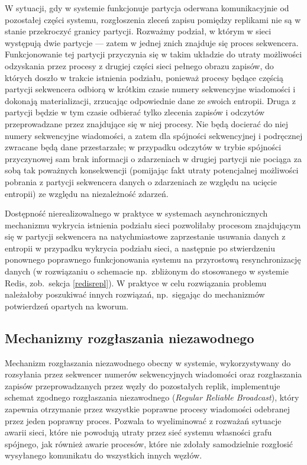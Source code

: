 W sytuacji, gdy w systemie funkcjonuje partycja oderwana komunikacyjnie od pozostałej części systemu, rozgłoszenia zleceń zapisu pomiędzy replikami nie są w stanie przekroczyć granicy partycji. Rozważmy podział, w którym w sieci występują dwie partycje --- zatem w jednej znich znajduje się proces sekwencera. Funkcjonowanie tej partycji przyczynia się w takim układzie do utraty możliwości odzyskania przez procesy z drugiej części sieci pełnego obrazu zapisów, do których doszło w trakcie istnienia podziału, ponieważ procesy będące częścią partycji sekwencera odbiorą w krótkim czasie numery sekwencyjne wiadomości i dokonają materializacji, zrzucając odpowiednie dane ze swoich entropii. Druga z partycji będzie w tym czasie odbierać tylko zlecenia zapisów i odczytów przeprowadzane przez znajdujące się w niej procesy. Nie będą docierać do niej numery sekwencyjne wiadomości, a zatem dla spójności sekwencyjnej i podręcznej zwracane będą dane przestarzałe; w przypadku odczytów w trybie spójności przyczynowej sam brak informacji o zdarzeniach w drugiej partycji nie pociąga za sobą tak poważnych konsekwencji (pomijając fakt utraty potencjalnej możliwości pobrania z partycji sekwencera danych o zdarzeniach ze względu na ucięcie entropii) ze względu na niezależność zdarzeń.

Dostępność nierealizowalnego w praktyce w systemach asynchronicznych mechanizmu wykrycia istnienia
podziału sieci pozwoliłaby procesom znajdującym się w partycji sekwencera na natychmiastowe
zaprzestanie usuwania danych z entropii w przypadku wykrycia podziału sieci, a następnie po
stwierdzeniu ponownego poprawnego funkcjonowania systemu na przyrostową resynchronizację danych (w
rozwiązaniu o schemacie np.\ zbliżonym do stosowanego w systemie Redis, zob.\ sekcja
\ref{redisrepl}). W praktyce w celu rozwiązania problemu należałoby poszukiwać innych rozwiązań,
np.\ sięgając do mechanizmów potwierdzeń opartych na kworum.

\subsection{Mechanizmy rozgłaszania niezawodnego} \label{subsection:reliablebroadcast}

Mechanizm rozgłaszania niezawodnego obecny w systemie, wykorzystywany do rozsyłania przez sekwencer numerów sekwencyjnych wiadomości oraz rozgłaszania zapisów przeprowadzanych przez węzły do pozostałych replik, implementuje schemat zgodnego rozgłaszania niezawodnego (\textit{Regular Reliable Broadcast}), który zapewnia otrzymanie przez wszystkie poprawne procesy wiadomości odebranej przez jeden poprawny proces. Pozwala to wyeliminować z rozważań sytuacje awarii sieci, które nie powodują utraty przez sieć systemu własności grafu spójnego, jak również awarie procesów, które nie zdołały samodzielnie rozgłosić wysyłanego komunikatu do wszystkich innych węzłów.

